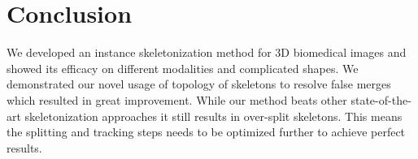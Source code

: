 
\chapter{Conclusion}\label{chapter:conclusion}

We developed an instance skeletonization method for 3D biomedical images and showed its efficacy on different modalities and complicated shapes.
We demonstrated our novel usage of topology of skeletons to resolve false merges which resulted in great improvement. While our method beats other state-of-the-art skeletonization approaches it still results in over-split skeletons. This means the splitting and tracking steps needs to be optimized further to achieve perfect results.